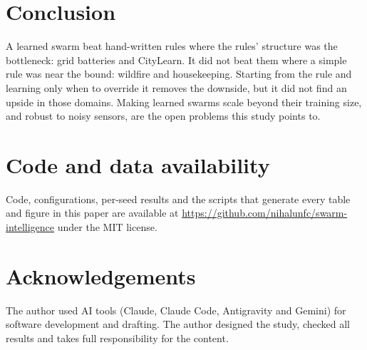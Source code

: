 \documentclass[11pt]{article}
\newcommand{\repo}{\url{https://github.com/nihalunfc/swarm-intelligence}}
\begin{document}
\section{Conclusion}
A learned swarm beat hand-written rules where the rules' structure was the bottleneck: grid batteries and CityLearn. It did not beat them where a simple rule was near the bound: wildfire and housekeeping. Starting from the rule and learning only when to override it removes the downside, but it did not find an upside in those domains. Making learned swarms scale beyond their training size, and robust to noisy sensors, are the open problems this study points to.

\section*{Code and data availability}
Code, configurations, per-seed results and the scripts that generate every table and figure in this paper are available at \repo{} under the MIT license.

\section*{Acknowledgements}
The author used AI tools (Claude, Claude Code, Antigravity and Gemini) for software development and drafting. The author designed the study, checked all results and takes full responsibility for the content.



\end{document}
